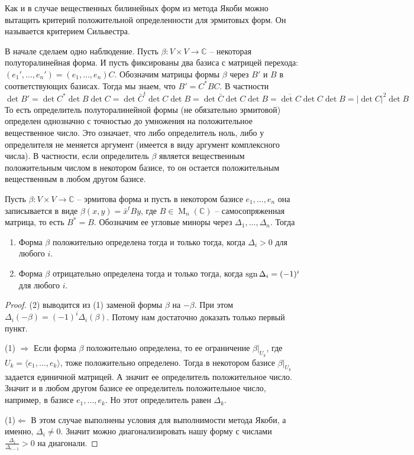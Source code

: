 Как и в случае вещественных билинейных форм из метода Якоби можно вытащить критерий положительной определенности для эрмитовых форм. Он называется критерием Сильвестра.

В  начале сделаем одно наблюдение. Пусть $\beta\colon V\times V\to \mathbb C$ -- некоторая полуторалинейная форма. И пусть фиксированы два базиса с матрицей перехода: $(e_1',\ldots,e_n') = (e_1,\ldots,e_n)C$. Обозначим матрицы формы $\beta$ через $B'$ и $B$ в соответствующих базисах. Тогда мы знаем, что $B' = C^* B C$. В частности
\[
\det B' = \det C^*\det B \det C = \det\bar C^t \det C\det B = \det \bar C\det C\det B = \overline{\det C}\det C \det B = |\det C|^2 \det B
\]
То есть определитель полуторалинейной формы (не обязательно эрмитовой) определен однозначно с точностью до умножения на положительное вещественное число. Это означает, что либо определитель ноль, либо у определителя не меняется аргумент (имеется в виду аргумент комплексного числа). В частности, если определитель $\beta$ является вещественным положительным числом в некотором базисе, то он остается положительным вещественным в любом другом базисе.

\begin{claim}
Пусть $\beta\colon V\times V\to \mathbb C$ -- эрмитова форма и пусть в некотором базисе $e_1,\ldots,e_n$ она записывается в виде $\beta(x, y) = \bar x^t B y$, где $B\in\operatorname{M}_n (\mathbb C)$ -- самосопряженная матрица, то есть $B^* = B$. Обозначим ее угловые миноры через $\Delta_1,\ldots,\Delta_n$. Тогда
\begin{enumerate}
\item Форма $\beta$ положительно определена тогда и только тогда, когда $\Delta_i > 0$ для любого $i$.

\item Форма $\beta$ отрицательно определена тогда и только тогда, когда $\operatorname{sgn} \Delta_i = (-1)^i$ для любого $i$.
\end{enumerate}
\end{claim}
\begin{proof}
(2) выводится из (1) заменой формы $\beta$ на $-\beta$. При этом $\Delta_i(-\beta) = (-1)^i \Delta_i(\beta)$. Потому нам достаточно доказать только первый пункт.

(1) $\Rightarrow$ Если форма $\beta$ положительно определена, то ее ограничение $\beta|_{U_k}$, где $U_k = \langle e_1,\ldots,e_k\rangle$, тоже положительно определено. Тогда в некотором базисе $\beta|_{U_k}$ задается единичной матрицей. А значит ее определитель положительное число. Значит и в любом другом базисе ее определитель положительное число, например, в базисе $e_1,\ldots,e_k$. Но этот определитель равен $\Delta_k$.

(1)$\Leftarrow$ В этом случае выполнены условия для выполнимости метода Якоби, а именно, $\Delta_i\neq 0$. Значит можно диагонализировать нашу форму с числами $\frac{\Delta_i}{\Delta_{i-1}} > 0$ на диагонали.
\end{proof}


